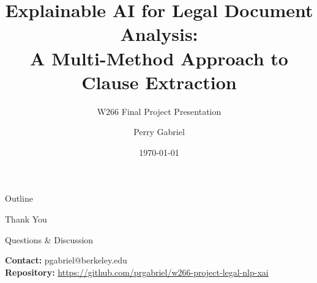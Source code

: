 \documentclass[aspectratio=169]{beamer}
\title[Legal NLP Explainability]{Explainable AI for Legal Document Analysis: \\
A Multi-Method Approach to Clause Extraction}
\subtitle{W266 Final Project Presentation}
\author[Gabriel]{Perry Gabriel}
\institute[UC Berkeley]{
  School of Information \\
  University of California, Berkeley
}
\date{\today}
\begin{document}
\frame{\titlepage}

\begin{frame}{Outline}
\tableofcontents
\end{frame}










\begin{frame}[plain]
\centering
\Huge \textcolor{berkeleyblue}{Thank You}
\vspace{1cm}

\Large Questions \& Discussion
\vspace{1cm}

\normalsize
\textbf{Contact:} pgabriel@berkeley.edu \\
\textbf{Repository:} \url{https://github.com/prgabriel/w266-project-legal-nlp-xai}
\end{frame}
\end{document}
